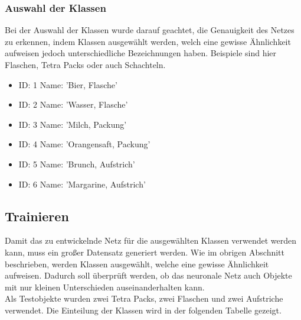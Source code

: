 \documentclass[a4paper,12pt,oneside]{article}
\begin{document}
  \subsubsection{Auswahl der Klassen} 
Bei der Auswahl der Klassen wurde darauf geachtet, die Genauigkeit des Netzes zu erkennen, indem Klassen ausgewählt werden, welch eine gewisse Ähnlichkeit aufweisen jedoch unterschiedliche Bezeichnungen haben. Beispiele sind hier Flaschen, Tetra Packs oder auch Schachteln.

  \vspace{0.5 cm}

  \begin{itemize}
  
  \item ID: 1 Name: 'Bier, Flasche'

  \item ID: 2 Name: 'Wasser, Flasche'

  \item ID: 3 Name: 'Milch, Packung'

  \item ID: 4 Name: 'Orangensaft, Packung'

  \item ID: 5 Name: 'Brunch, Aufstrich'

  \item ID: 6 Name: 'Margarine, Aufstrich'
  
  \end{itemize}
    
  
  \subsection{Trainieren}
Damit das zu entwickelnde Netz für die ausgewählten Klassen verwendet werden kann, muss ein großer Datensatz generiert werden. Wie im obrigen Abschnitt beschrieben, werden Klassen ausgewählt, welche eine gewisse Ähnlichkeit aufweisen. Dadurch soll überprüft werden, ob das neuronale Netz auch Objekte mit nur kleinen Unterschieden auseinanderhalten kann.\\
Als Testobjekte wurden zwei Tetra Packs, zwei Flaschen und zwei Aufstriche verwendet. Die Einteilung der Klassen wird in der folgenden Tabelle gezeigt.
\\
\\
\end{document}
